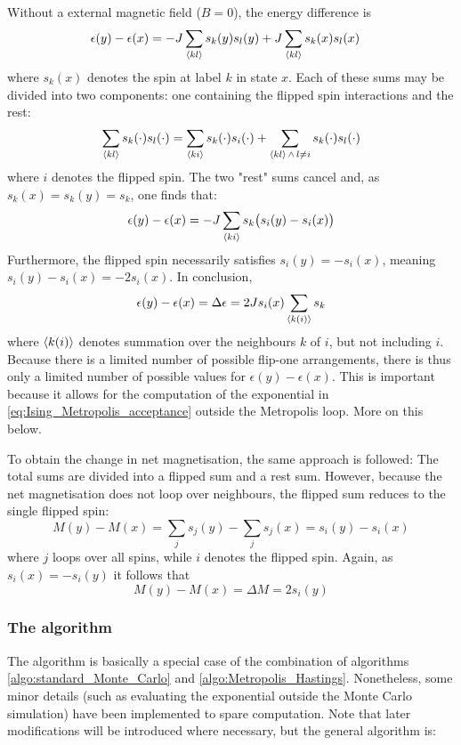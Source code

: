 \documentclass[nofootinbib,reprint,english]{revtex4-1}
\begin{document}
Without a external magnetic field (\(B=0\)), the energy difference is
\begin{align*}
\epsilon(y)-\epsilon(x)&=-J\sum_{\expval{kl}}s_k(y)s_l(y)+J\sum_{\expval{kl}}s_k(x)s_l(x)
\end{align*}
where \(s_k(x)\) denotes the spin at label \(k\) in state \(x\). Each of these sums may be divided into two components: one containing the flipped spin interactions and the rest:
\[\sum_{\expval{kl}}s_k(\cdot)s_l(\cdot)=\sum_{\expval{ki}}s_k(\cdot)s_i(\cdot)+\sum_{\expval{kl}\,\wedge\,l\neq i}s_k(\cdot)s_l(\cdot)\]
where \(i\) denotes the flipped spin. The two "rest" sums cancel and, as \(s_k(x)=s_k(y)=s_k\), one finds that:
\[\epsilon(y)-\epsilon(x)=-J\sum_{\expval{ki}}s_k\big(s_i(y)-s_i(x)\big)\]
Furthermore, the flipped spin necessarily satisfies \(s_i(y)=-s_i(x)\), meaning \(s_i(y)-s_i(x)=-2s_i(x)\). In conclusion,
\begin{equation}\label{eq:Ising_flip_one_energy_change}
\epsilon(y)-\epsilon(x)=\Delta\epsilon=2Js_i(x)\sum_{\expval{k(i)}}s_k
\end{equation}
where \(\expval{k(i)}\) denotes summation over the neighbours \(k\) of \(i\), but not including \(i\). Because there is a limited number of possible flip-one arrangements, there is thus only a limited number of possible values for \(\epsilon(y)-\epsilon(x)\). This is important because it allows for the computation of the exponential in \eqref{eq:Ising_Metropolis_acceptance} outside the Metropolis loop. More on this below.

To obtain the change in net magnetisation, the same approach is followed: The total sums are divided into a flipped sum and a rest sum. However, because the net magnetisation does not loop over neighbours, the flipped sum reduces to the single flipped spin:
\[M(y)-M(x)=\sum_{j}s_j(y)-\sum_{j}s_j(x)=s_i(y)-s_i(x)\]
where \(j\) loops over all spins, while \(i\) denotes the flipped spin. Again, as \(s_i(x)=-s_i(y)\) it follows that
\begin{equation}
M(y)-M(x)=\Delta M=2s_i(y)
\end{equation}

\subsubsection{The algorithm}
The algorithm is basically a special case of the combination of algorithms \ref{algo:standard_Monte_Carlo} and \ref{algo:Metropolis_Hastings}. Nonetheless, some minor details (such as evaluating the exponential outside the Monte Carlo simulation) have been implemented to spare computation. Note that later modifications will be introduced where necessary, but the general algorithm is:
\end{document}
